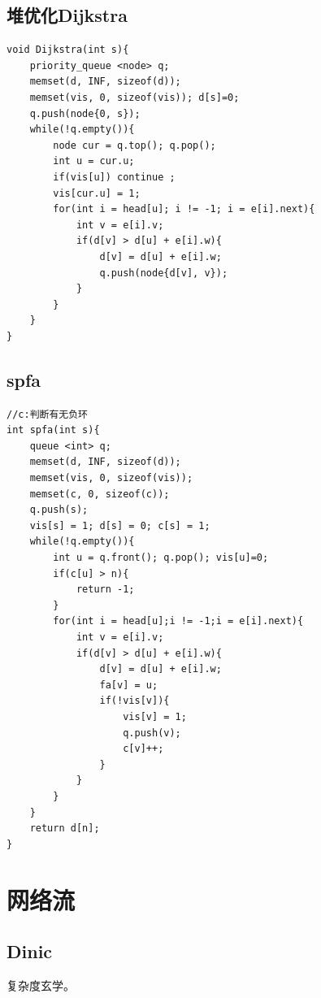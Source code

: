 \documentclass[a4paper,11pt,twoside,fontset = fandol,UTF8]{ctexbook} %
\begin{document}
	\subsection{堆优化Dijkstra}
	\begin{lstlisting}
void Dijkstra(int s){
    priority_queue <node> q;
	memset(d, INF, sizeof(d));
    memset(vis, 0, sizeof(vis)); d[s]=0;
    q.push(node{0, s});
    while(!q.empty()){
        node cur = q.top(); q.pop();
        int u = cur.u;
        if(vis[u]) continue ;
        vis[cur.u] = 1;
        for(int i = head[u]; i != -1; i = e[i].next){
            int v = e[i].v;
            if(d[v] > d[u] + e[i].w){
                d[v] = d[u] + e[i].w;
                q.push(node{d[v], v});
            }
        }
    }
}
	\end{lstlisting}
	\subsection{spfa}
	\begin{lstlisting}
//c:判断有无负环
int spfa(int s){
    queue <int> q;
    memset(d, INF, sizeof(d));
    memset(vis, 0, sizeof(vis));
    memset(c, 0, sizeof(c));
    q.push(s);
    vis[s] = 1; d[s] = 0; c[s] = 1;
    while(!q.empty()){
        int u = q.front(); q.pop(); vis[u]=0;
        if(c[u] > n){
            return -1;
        }
        for(int i = head[u];i != -1;i = e[i].next){
            int v = e[i].v;
            if(d[v] > d[u] + e[i].w){
                d[v] = d[u] + e[i].w;
                fa[v] = u;
                if(!vis[v]){
                    vis[v] = 1;
                    q.push(v);
                    c[v]++;
                }
            }
        }
    }
    return d[n];
}
	\end{lstlisting}
	\section{网络流}
	\subsection{Dinic}
复杂度玄学。
\end{document}
